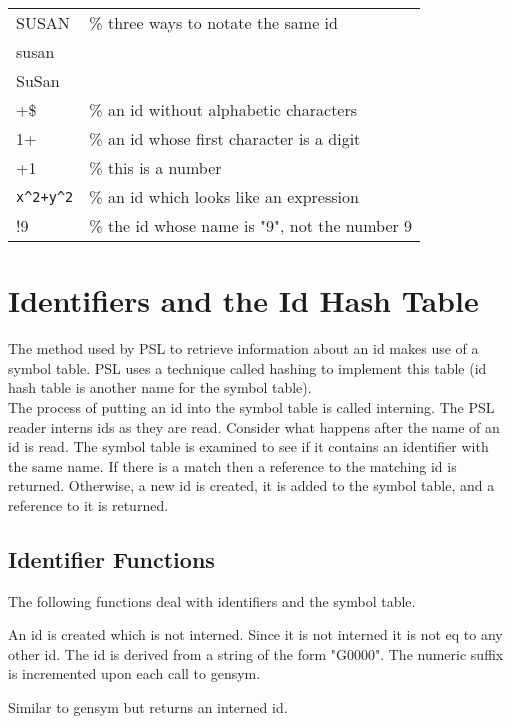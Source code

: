 \begin{tabular}{ll}
SUSAN &  \% three ways to notate the same id\\
susan\\
SuSan\\
+\$ &     \% an id without alphabetic characters\\
1+ &    \% an id whose first character is a digit\\
+1 &     \% this is a number\\
\verb/x^2+y^2/ & \% an id which looks like an expression\\
!9 &     \% the id whose name is "9", not the number 9\\
\end{tabular}

\section{Identifiers and the Id Hash Table}

The method used by PSL to retrieve  information  about  an  id
makes  use  of  a  symbol  table.    PSL uses a technique called
hashing to implement this table (id hash table is  another  name
for the symbol table).\\

\noindent
The  process  of putting an id into the symbol table is called
interning.  The  PSL  reader  interns  ids  as  they  are  read.
Consider  what  happens  after  the  name of an id is read.  The
symbol table is examined to see if  it  contains  an  identifier
with the same name.  If there is a match then a reference to the
matching  id is returned.  Otherwise, a new id is created, it is
added to the symbol table, and a reference to it is returned.

\subsection{Identifier Functions}

The following functions deal with identifiers and  the  symbol
table.


{    An  id  is  created  which is not interned.  Since it is not
    interned it is not eq to any other id.  The  id  is  derived
    from  a  string  of the form "G0000".  The numeric suffix is
    incremented upon each call to gensym.
}

{    Similar to gensym but returns an interned id.
}

